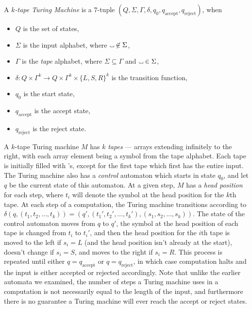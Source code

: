 \begin{defn}
    A \emph{$k$-tape Turing Machine} is a $7$-tuple $(Q, \Sigma, \Gamma, \delta, q_0, q_{\textrm{accept}}, q_{\textrm{reject}})$, when
    \begin{itemize}
        \item $Q$ is the set of states,
        \item $\Sigma$ is the input alphabet, where $\tapeblank \not\in \Sigma$,
        \item $\Gamma$ is the \emph{tape} alphabet, where $\Sigma \subseteq \Gamma$ and $\tapeblank \in \Sigma$, 
        \item $\delta: Q \times \Gamma^{k} \to Q \times \Gamma^{k} \times \{L, S, R\}^{k}$ is the transition function,
        \item $q_0$ is the start state,
        \item $q_{\textrm{accept}}$ is the accept state,
        \item $q_{\textrm{reject}}$ is the reject state.
    \end{itemize}

    A $k$-tape Turing machine $M$ has $k$ \emph{tapes} --- arrays extending infinitely to the right, with each array element being a symbol from the tape alphabet. Each tape is initially filled with \tapeblank's, except for the first tape which first has the entire input. The Turing machine also has a \emph{control} automaton which starts in state $q_0$, and let $q$ be the current state of this automaton. At a given step, $M$ has a \emph{head position} for each step, where $t_i$ will denote the symbol at the head position for the $k$th tape. At each step of a computation, the Turing machine transitions according to $\delta(q, (t_1, t_2, \ldots, t_k)) = (q', (t_1', t_2', \ldots, t_k'), (s_1, s_2, \ldots, s_k))$. The state of the control automaton moves from $q$ to $q'$, the symbol at the head position of each tape is changed from $t_i$ to $t_i'$, and then the head position for the $i$th tape is moved to the left if $s_i = L$ (and the head position isn't already at the start), doesn't change if $s_i = S$, and moves to the right if $s_i = R$. This process is repeated until either $q = q_{\textrm{accept}}$ or $q = q_{\textrm{reject}}$, in which case computation halts and the input is either accepted or rejected accordingly. Note that unlike the earlier automata we examined, the number of steps a Turing machine uses in a computation is not necessarily equal to the length of the input, and furthermore there is no guarantee a Turing machine will ever reach the accept or reject states.
\end{defn}

